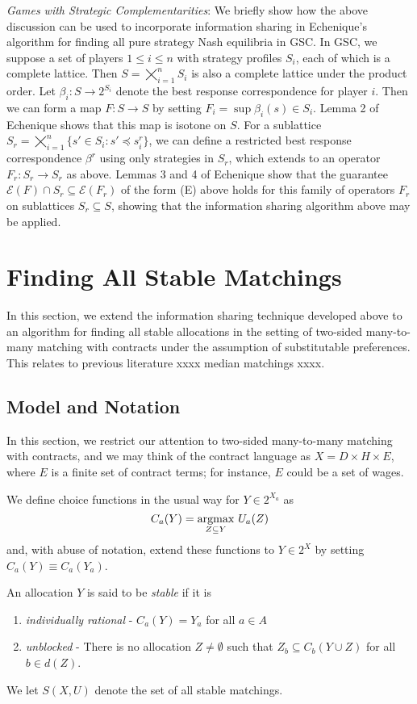 \documentclass[11pt,reqno]{amsart}
\theoremstyle{definition}
\numberwithin{equation}{section}
\newcommand{\argmax}{\operatornamewithlimits{argmax}}
\newcommand{\sub}{\subseteq}
\newcommand{\fix}{\mathcal{E}}
\newcommand{\peq}{\preceq}
\newcommand{\oper}{F}
\begin{document}
\emph{Games with Strategic Complementarities}: We briefly show how the above discussion can be used to incorporate information sharing in Echenique's algorithm for finding all pure strategy Nash equilibria in GSC. 
In GSC, we suppose a set of players $1 \leq i \leq n$ with strategy profiles $S_i$, each of which is a complete lattice.
Then $S = \bigtimes_{i = 1}^n S_i$ is also a complete lattice under the product order.
Let $\beta_i: S \to 2^{S_i}$ denote the best response correspondence for player $i$.
Then we can form a map $\oper: S \to S$ by setting $\oper_i = \sup \beta_i(s) \in S_i$.
Lemma 2 of Echenique shows that this map is isotone on $S$.
For a sublattice $S_r = \bigtimes_{i = 1}^n \{s' \in S_i: s' \peq s^r_i\}$, we can define a restricted best response correspondence $\beta^r$ using only strategies in $S_r$, which extends to an operator $\oper_r: S_r \to S_r$ as above.
Lemmas 3 and 4 of Echenique show that the guarantee $\fix(\oper) \cap S_r \sub \fix (F_r)$ of the form (E) above holds for this family of operators $\oper_r$ on sublattices $S_r \sub S$, showing that the information sharing algorithm above may be applied.

\section{Finding All Stable Matchings} 
In this section, we extend the information sharing technique developed above to an algorithm for finding all stable allocations in the setting of two-sided many-to-many matching with contracts under the assumption of substitutable preferences.
This relates to previous literature xxxx median matchings xxxx.

\subsection{Model and Notation} 
In this section, we restrict our attention to two-sided many-to-many matching with contracts, and we may think of the contract language as $X = D\times H \times E$, where $E$ is a finite set of contract terms; for instance, $E$ could be a set of wages.

We define choice functions in the usual way for $Y\in 2^{X_a}$ as 
\[
C_a(Y) = \argmax_{Z\subseteq Y} \, U_a(Z)
\]
and, with abuse of notation, extend these functions to $Y\in 2^X$ by setting $C_a(Y) \equiv C_a(Y_a)$.

An allocation $Y$ is said to be \emph{stable} if it is 
\begin{enumerate}
\item \emph{individually rational} - $C_a(Y) = Y_a$ for all $a \in A$
\item \emph{unblocked} - There is no allocation $Z \not = \emptyset$ such that $Z_b \sub C_b(Y\cup Z)$ for all $b \in d(Z)$. 
\end{enumerate}
We let $S(X,U)$ denote the set of all stable matchings.
\end{document}
